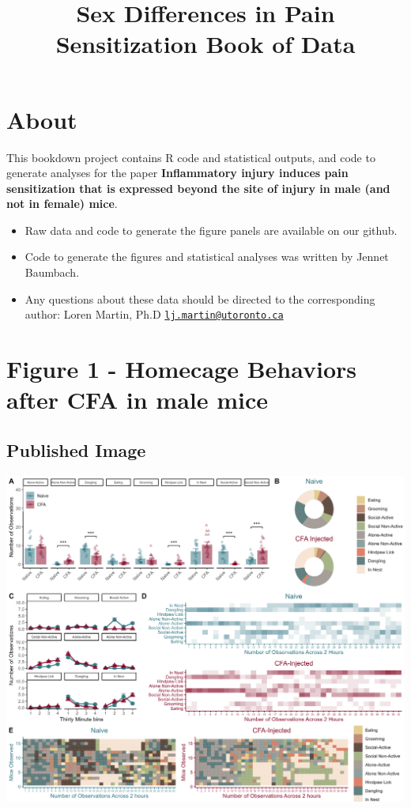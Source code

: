 \documentclass[
]{book}
\title{Sex Differences in Pain Sensitization Book of Data}
\author{}
\date{\vspace{-2.5em}}
\begin{document}
\maketitle

{
\setcounter{tocdepth}{1}
\tableofcontents
}
\hypertarget{about}{%
\chapter*{About}\label{about}}

This bookdown project contains R code and statistical outputs, and code to generate analyses for the paper \textbf{Inflammatory injury induces pain sensitization that is expressed beyond the site of injury in male (and not in female) mice}.

\begin{itemize}
\item
  Raw data and code to generate the figure panels are available on our github.
\item
  Code to generate the figures and statistical analyses was written by Jennet Baumbach.
\item
  Any questions about these data should be directed to the corresponding author: Loren Martin, Ph.D \href{mailto:lj.martin@utoronto.ca}{\nolinkurl{lj.martin@utoronto.ca}}
\end{itemize}

\hypertarget{figure-1---homecage-behaviors-after-cfa-in-male-mice}{%
\chapter*{Figure 1 - Homecage Behaviors after CFA in male mice}\label{figure-1---homecage-behaviors-after-cfa-in-male-mice}}

\hypertarget{published-image}{%
\section*{Published Image}\label{published-image}}

\includegraphics[width=45.83in]{Figs/1_male_HC_panel}
\end{document}

